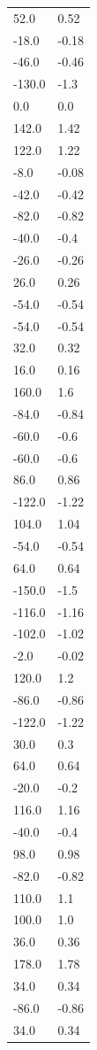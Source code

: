 \begin{longtable}{ll}
52.0 & 0.52 \\
-18.0 & -0.18 \\
-46.0 & -0.46 \\
-130.0 & -1.3 \\
0.0 & 0.0 \\
142.0 & 1.42 \\
122.0 & 1.22 \\
-8.0 & -0.08 \\
-42.0 & -0.42 \\
-82.0 & -0.82 \\
-40.0 & -0.4 \\
-26.0 & -0.26 \\
26.0 & 0.26 \\
-54.0 & -0.54 \\
-54.0 & -0.54 \\
32.0 & 0.32 \\
16.0 & 0.16 \\
160.0 & 1.6 \\
-84.0 & -0.84 \\
-60.0 & -0.6 \\
-60.0 & -0.6 \\
86.0 & 0.86 \\
-122.0 & -1.22 \\
104.0 & 1.04 \\
-54.0 & -0.54 \\
64.0 & 0.64 \\
-150.0 & -1.5 \\
-116.0 & -1.16 \\
-102.0 & -1.02 \\
-2.0 & -0.02 \\
120.0 & 1.2 \\
-86.0 & -0.86 \\
-122.0 & -1.22 \\
30.0 & 0.3 \\
64.0 & 0.64 \\
-20.0 & -0.2 \\
116.0 & 1.16 \\
-40.0 & -0.4 \\
98.0 & 0.98 \\
-82.0 & -0.82 \\
110.0 & 1.1 \\
100.0 & 1.0 \\
36.0 & 0.36 \\
178.0 & 1.78 \\
34.0 & 0.34 \\
-86.0 & -0.86 \\
34.0 & 0.34 \\

\end{longtable}
